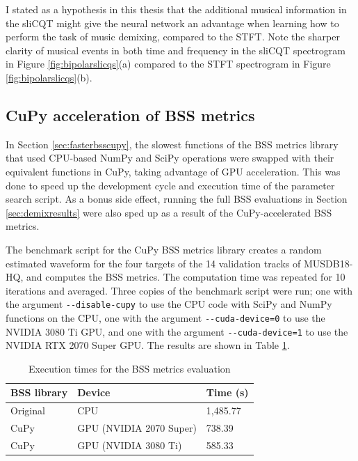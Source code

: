\documentclass[report.tex]{subfiles}
\begin{document}
I stated as a hypothesis in this thesis that the additional musical information in the sliCQT might give the neural network an advantage when learning how to perform the task of music demixing, compared to the STFT. Note the sharper clarity of musical events in both time and frequency in the sliCQT spectrogram in Figure \ref{fig:bipolarslicqs}(a) compared to the STFT spectrogram in Figure \ref{fig:bipolarslicqs}(b).

\subsection{CuPy acceleration of BSS metrics}
\label{sec:cupyportbss}

In Section \ref{sec:fasterbsscupy}, the slowest functions of the BSS metrics library that used CPU-based NumPy and SciPy operations were swapped with their equivalent functions in CuPy, taking advantage of GPU acceleration. This was done to speed up the development cycle and execution time of the parameter search script. As a bonus side effect, running the full BSS evaluations in Section \ref{sec:demixresults} were also sped up as a result of the CuPy-accelerated BSS metrics.

The benchmark script for the CuPy BSS metrics library creates a random estimated waveform for the four targets of the 14 validation tracks of MUSDB18-HQ, and computes the BSS metrics. The computation time was repeated for 10 iterations and averaged. Three copies of the benchmark script were run; one with the argument \Verb#--disable-cupy# to use the CPU code with SciPy and NumPy functions on the CPU, one with the argument \Verb#--cuda-device=0# to use the NVIDIA 3080 Ti GPU, and one with the argument \Verb#--cuda-device=1# to use the NVIDIA RTX 2070 Super GPU. The results are shown in Table \ref{table:cupybssresults}.

\begin{table}[ht]
	\centering
	\caption{Execution times for the BSS metrics evaluation}
	\label{table:cupybssresults}
	\begin{tabular}{ |l|l|l| }
	 \hline
		BSS library & Device & Time (s) \\
	 \hline
	 \hline
		Original & CPU & 1,485.77 \\
	 \hline
		CuPy & GPU (NVIDIA 2070 Super) & 738.39 \\
	 \hline
		CuPy & GPU (NVIDIA 3080 Ti) & 585.33 \\
	 \hline
\end{tabular}
\end{table}
\end{document}
